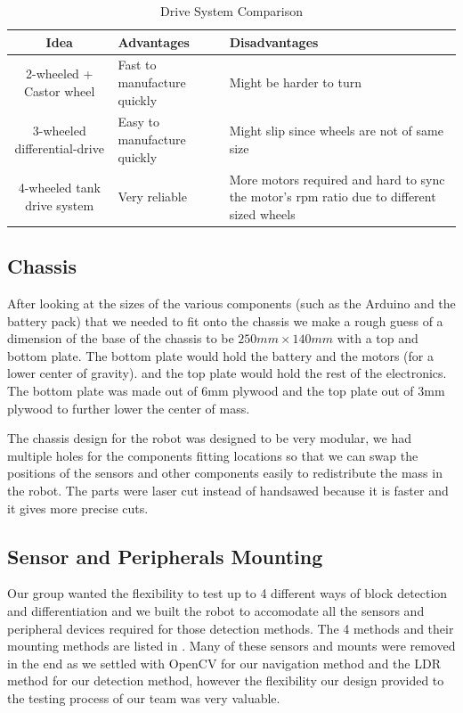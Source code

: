 \documentclass{article}
\begin{document}
\begin{table}[]
    \centering
    \begin{tabular}{|c|p{5cm}|p{5cm}|}
        \hline
        Idea & Advantages & Disadvantages \\
        \hline
        2-wheeled + Castor wheel & Fast to manufacture quickly& Might be harder to turn \\
        3-wheeled differential-drive & Easy to manufacture quickly & Might slip since wheels are not of same size \\
        4-wheeled tank drive system & Very reliable & More motors required and hard to sync the motor's rpm ratio due to different sized wheels \\
        \hline
    \end{tabular}
    \caption{Drive System Comparison}
    \label{tab:drive_comp}
\end{table}

\subsection{Chassis}
\quad After looking at the sizes of the various components (such as the Arduino and the battery pack) that we needed to fit onto the chassis we make a rough guess of a dimension of the base of the chassis to be $250mm \times 140mm$ with a top and bottom plate. The bottom plate would hold the battery and the motors (for a lower center of gravity). and the top plate would hold the rest of the electronics. The bottom plate was made out of 6mm plywood and the top plate out of 3mm plywood to further lower the center of mass.

The chassis design for the robot was designed to be very modular, we had multiple holes for the components fitting locations so that we can swap the positions of the sensors and other components easily to redistribute the mass in the robot. The parts were laser cut instead of handsawed because it is faster and it gives more precise cuts.

\subsection{Sensor and Peripherals Mounting}
\quad Our group wanted the flexibility to test up to 4 different ways of block detection and differentiation and we built the robot to accomodate all the sensors and peripheral devices required for those detection methods. The 4 methods and their mounting methods are listed in . Many of these sensors and mounts were removed in the end as we settled with OpenCV for our navigation method and the LDR method for our detection method, however the flexibility our design provided to the testing process of our team was very valuable.
\end{document}
